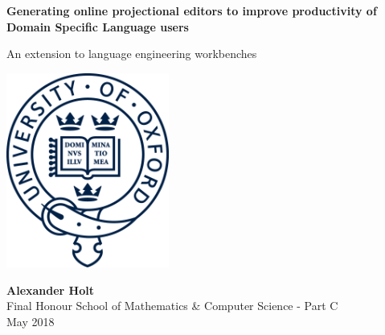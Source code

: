 \documentclass{article}
\begin{document}
\newcommand{\RSetup}[0]{R1\xspace}
\newcommand{\RCustom}[0]{R2\xspace}
\newcommand{\RLightweight}[0]{R3\xspace}
\newcommand{\RIntuitive}[0]{R4\xspace}
\newcommand{\RFamiliarity}{R5\xspace}


\begin{titlepage}
    \begin{center}
        \vspace*{1cm}
        
        \Huge
        \textbf{Generating online projectional editors to improve productivity of Domain Specific Language users}
        
        \vspace{0.5cm}
        \LARGE
        An extension to language engineering workbenches
        
        
        \vspace{1.5cm}
        
        \includegraphics[width=0.4\textwidth]{uniLogo.png}
        \vspace{1.5cm}
        
        \textbf{Alexander Holt}\\
        \vfill
        \Large
        Final Honour School of Mathematics \& Computer Science - Part C\\
        \vspace{0.4cm}
        May 2018
        
        
        
    \end{center}
\end{titlepage}

\end{document}
